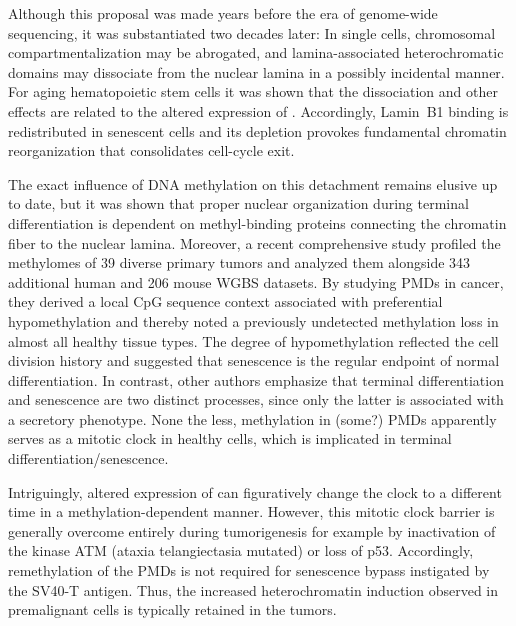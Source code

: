 Although this proposal was made years before the era of genome-wide sequencing, it was substantiated two decades later: In single cells, chromosomal compartmentalization may be abrogated\cite{Kind2015}, and lamina-associated heterochromatic domains may dissociate from the nuclear lamina in a possibly incidental manner\cite{Chandra2015}. For aging hematopoietic stem cells it was shown that the dissociation and other effects are related to the altered expression of \cite{Espada2008,Grigoryan2018}. Accordingly, Lamin~B1 binding is redistributed in senescent cells\cite{Sadaie2013} and its depletion provokes fundamental chromatin reorganization that consolidates cell-cycle exit\cite{Shah2013,Chandra2015}.

The exact influence of DNA methylation on this detachment remains elusive up to date, but it was shown that proper nuclear organization during terminal differentiation is dependent on methyl-binding proteins\cite{Brero2005,Linhoff2015} connecting the chromatin fiber to the nuclear lamina\cite{Guarda2009}. Moreover, a recent comprehensive study profiled the methylomes of 39 diverse primary tumors and analyzed them alongside 343 additional human and 206 mouse WGBS datasets\cite{Zhou2018}. By studying PMDs in cancer, they derived a local CpG sequence context associated with preferential hypomethylation and thereby noted a previously undetected methylation loss in almost all healthy tissue types. The degree of hypomethylation reflected the cell division history and suggested that senescence is the regular endpoint of normal differentiation\cite{Chandra2015}. In contrast, other authors emphasize that terminal differentiation and senescence are two distinct processes\cite{Gorgoulis2019},  since only the latter is associated with a secretory phenotype\cite{Ito2018}. None the less, methylation in (some?) PMDs apparently serves as a mitotic clock in healthy cells, which is implicated in terminal differentiation/senescence\cite{Zhou2018}.

Intriguingly, altered expression of  can figuratively change the clock to a different time in a methylation-dependent manner\cite{Lin2014}. However, this mitotic clock barrier is generally overcome entirely during tumorigenesis for example by inactivation of the kinase ATM (ataxia telangiectasia mutated) or loss of p53\cite{Collado2005}. Accordingly, remethylation of the PMDs is not required for senescence bypass instigated by the SV40-T antigen\cite{Cruickshanks2013}. Thus, the increased heterochromatin induction observed in premalignant cells is typically retained in the tumors.

